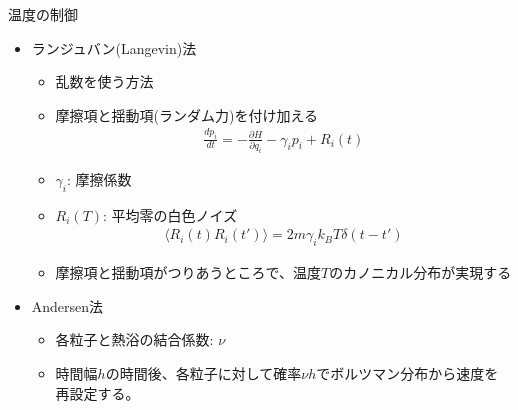 
\begin{frame}[t,fragile]{温度の制御}
  \begin{itemize}
  \item ランジュバン(Langevin)法
    \begin{itemize}
    \item 乱数を使う方法
    \item 摩擦項と揺動項(ランダム力)を付け加える
      \begin{align*}
        \frac{dp_i}{dt} = - \frac{\partial H}{\partial q_i} - \gamma_i p_i + R_i(t)
      \end{align*}
    \item $\gamma_i$: 摩擦係数
    \item $R_i(T)$: 平均零の白色ノイズ
      \begin{align*}
        \langle R_i(t) R_i(t') \rangle = 2 m \gamma_i k_B T \delta(t-t')
      \end{align*}
    \item 摩擦項と揺動項がつりあうところで、温度$T$のカノニカル分布が実現する
    \end{itemize}
  \item Andersen法
    \begin{itemize}
    \item 各粒子と熱浴の結合係数: \(\nu\)
    \item 時間幅\(h\)の時間後、各粒子に対して確率\(\nu h\)でボルツマン分布から速度を再設定する。
    \end{itemize}
  \end{itemize}
\end{frame}
